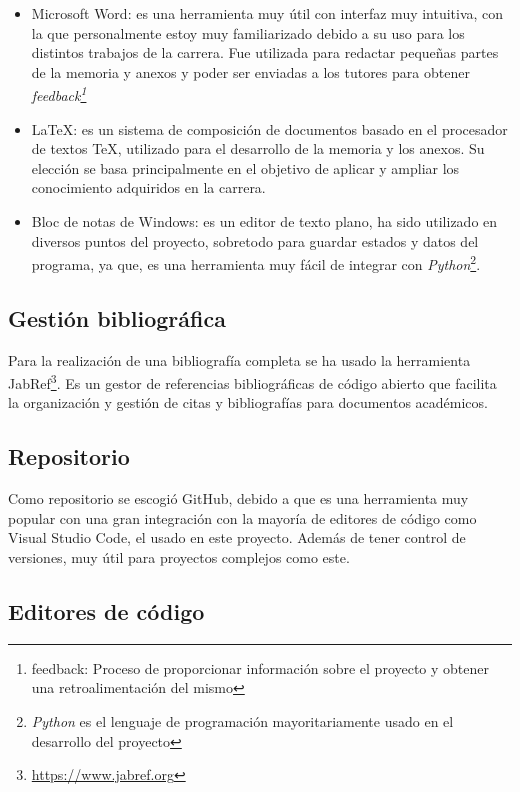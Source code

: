 \begin{itemize}
    \item Microsoft Word: es una herramienta muy útil con interfaz muy intuitiva, con la que personalmente estoy muy familiarizado debido a su uso para los distintos trabajos de la carrera. Fue utilizada para redactar pequeñas partes de la memoria y anexos y poder ser enviadas a los tutores para obtener \textit{feedback\footnote{feedback: Proceso de proporcionar información sobre el proyecto y obtener una retroalimentación del mismo}}
    \item \LaTeX{}: es un sistema de composición de documentos basado en el procesador de textos TeX, utilizado para el desarrollo de la memoria y los anexos. Su elección se basa principalmente en el objetivo de aplicar y ampliar los conocimiento adquiridos en la carrera.
    \item Bloc de notas de Windows: es un editor de texto plano, ha sido utilizado en diversos puntos del proyecto, sobretodo para guardar estados y datos del programa, ya que, es una herramienta muy fácil de integrar con \textit{Python}\footnote{\textit{Python} es el lenguaje de programación mayoritariamente usado en el desarrollo del proyecto}.
\end{itemize}

\subsection{Gestión bibliográfica}
Para la realización de una bibliografía completa se ha usado la herramienta JabRef\footnote{\url{https://www.jabref.org}}. Es un gestor de referencias bibliográficas de código abierto que facilita la organización y gestión de citas y bibliografías para documentos académicos. 

\subsection{Repositorio}

Como repositorio se escogió GitHub, debido a que es una herramienta muy popular con una gran integración con la mayoría de editores de código como Visual Studio Code, el usado en este proyecto. Además de tener control de versiones, muy útil para proyectos complejos como este.


\subsection{Editores de código}

